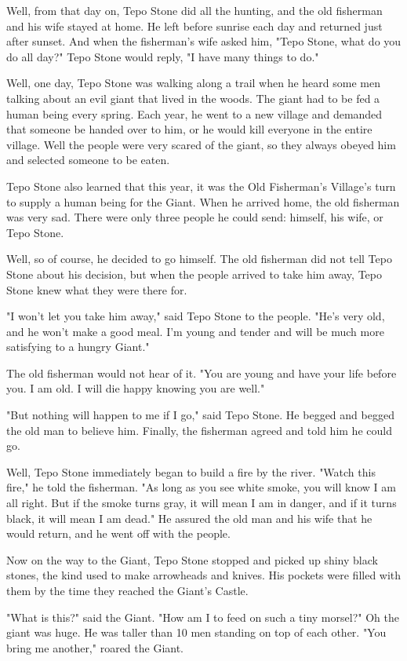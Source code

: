 Well, from that day on, Tepo Stone did all the hunting, and the old fisherman and his wife stayed at home. He left before sunrise each day and returned just after sunset. And when the fisherman's wife asked him, "Tepo Stone, what do you do all day?" Tepo Stone would reply, "I have many things to do."

Well, one day, Tepo Stone was walking along a trail when he heard some men talking about an evil giant that lived in the woods. The giant had to be fed a human being every spring. Each year, he went to a new village and demanded that someone be handed over to him, or he would kill everyone in the entire village. Well the people were very scared of the giant, so they always obeyed him and selected someone to be eaten.

Tepo Stone also learned that this year, it was the Old Fisherman's Village's turn to supply a human being for the Giant. When he arrived home, the old fisherman was very sad. There were only three people he could send: himself, his wife, or Tepo Stone.

Well, so of course, he decided to go himself. The old fisherman did not tell Tepo Stone about his decision, but when the people arrived to take him away, Tepo Stone knew what they were there for.

"I won't let you take him away," said Tepo Stone to the people. "He's very old, and he won't make a good meal. I'm young and tender and will be much more satisfying to a hungry Giant."

The old fisherman would not hear of it. "You are young and have your life before you. I am old. I will die happy knowing you are well."

"But nothing will happen to me if I go," said Tepo Stone. He begged and begged the old man to believe him. Finally, the fisherman agreed and told him he could go.

Well, Tepo Stone immediately began to build a fire by the river. "Watch this fire," he told the fisherman. "As long as you see white smoke, you will know I am all right. But if the smoke turns gray, it will mean I am in danger, and if it turns black, it will mean I am dead." He assured the old man and his wife that he would return, and he went off with the people.

Now on the way to the Giant, Tepo Stone stopped and picked up shiny black stones, the kind used to make arrowheads and knives. His pockets were filled with them by the time they reached the Giant's Castle.

"What is this?" said the Giant. "How am I to feed on such a tiny morsel?" Oh the giant was huge. He was taller than 10 men standing on top of each other. "You bring me another," roared the Giant.

